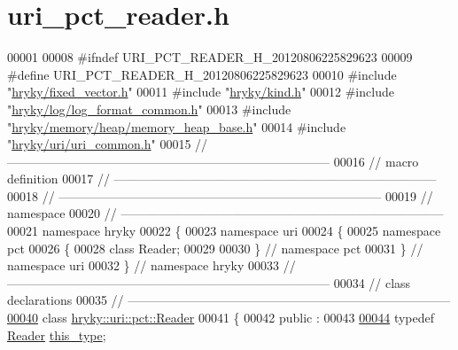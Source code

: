 \hypertarget{uri__pct__reader_8h_source}{\section{uri\-\_\-pct\-\_\-reader.\-h}
}

\begin{DoxyCode}
00001 
00008 \textcolor{preprocessor}{#ifndef URI\_PCT\_READER\_H\_20120806225829623}
00009 \textcolor{preprocessor}{}\textcolor{preprocessor}{#define URI\_PCT\_READER\_H\_20120806225829623}
00010 \textcolor{preprocessor}{}\textcolor{preprocessor}{#include "\hyperlink{fixed__vector_8h}{hryky/fixed_vector.h}"}
00011 \textcolor{preprocessor}{#include "\hyperlink{kind_8h}{hryky/kind.h}"}
00012 \textcolor{preprocessor}{#include "\hyperlink{log__format__common_8h}{hryky/log/log_format_common.h}"}
00013 \textcolor{preprocessor}{#include "\hyperlink{memory__heap__base_8h}{hryky/memory/heap/memory_heap_base.h}"}
00014 \textcolor{preprocessor}{#include "\hyperlink{uri__common_8h}{hryky/uri/uri_common.h}"}
00015 \textcolor{comment}{//
      ------------------------------------------------------------------------------}
00016 \textcolor{comment}{// macro definition}
00017 \textcolor{comment}{//
      ------------------------------------------------------------------------------}
00018 \textcolor{comment}{//
      ------------------------------------------------------------------------------}
00019 \textcolor{comment}{// namespace}
00020 \textcolor{comment}{//
      ------------------------------------------------------------------------------}
00021 \textcolor{keyword}{namespace }hryky
00022 \{
00023 \textcolor{keyword}{namespace }uri
00024 \{
00025 \textcolor{keyword}{namespace }pct
00026 \{
00028     \textcolor{keyword}{class }Reader;
00029 
00030 \} \textcolor{comment}{// namespace pct}
00031 \} \textcolor{comment}{// namespace uri}
00032 \} \textcolor{comment}{// namespace hryky}
00033 \textcolor{comment}{//
      ------------------------------------------------------------------------------}
00034 \textcolor{comment}{// class declarations}
00035 \textcolor{comment}{//
      ------------------------------------------------------------------------------}
\hypertarget{uri__pct__reader_8h_source_l00040}{}\hyperlink{classhryky_1_1uri_1_1pct_1_1_reader}{00040} \textcolor{comment}{}\textcolor{keyword}{class }\hyperlink{classhryky_1_1uri_1_1pct_1_1_reader}{hryky::uri::pct::Reader}
00041 \{
00042 \textcolor{keyword}{public} :
00043 
\hypertarget{uri__pct__reader_8h_source_l00044}{}\hyperlink{classhryky_1_1uri_1_1pct_1_1_reader_a3b7a7d66f38f342ae28d4200727cdff1}{00044}     \textcolor{keyword}{typedef} \hyperlink{classhryky_1_1uri_1_1pct_1_1_reader}{Reader}              \hyperlink{classhryky_1_1uri_1_1pct_1_1_reader_a3b7a7d66f38f342ae28d4200727cdff1}{this_type};

\end{DoxyCode}
